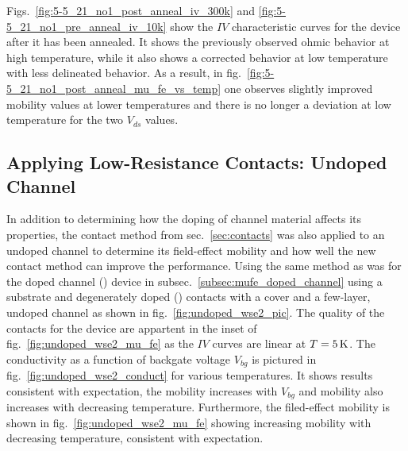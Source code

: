 Figs.~\ref{fig:5-5_21_no1_post_anneal_iv_300k} and \ref{fig:5-5_21_no1_pre_anneal_iv_10k} show the $IV$ characteristic curves for the device after it has been annealed. It shows the previously observed ohmic behavior at high temperature, while it also shows a corrected behavior at low temperature with less delineated behavior. As a result, in fig.~\ref{fig:5-5_21_no1_post_anneal_mu_fe_vs_temp} one observes slightly improved mobility values at lower temperatures and there is no longer a deviation at low temperature for the two $V_{ds}$ values. 

\subsection{Applying Low-Resistance Contacts: Undoped Channel}\label{subsec:mufe_undoped_channel}
In addition to determining how the doping of channel material affects its properties, the contact method from sec.~\ref{sec:contacts} was also applied to an undoped channel to determine its field-effect mobility and how well the new contact method can improve the performance. Using the same method as was for the doped channel (\lightlyone) device in subsec.~\ref{subsec:mufe_doped_channel} using a \hbn substrate and degenerately doped (\degenerate) contacts with a \hbn cover and a few-layer, undoped  channel as shown in fig.~\ref{fig:undoped_wse2_pic}. The quality of the contacts for the device are appartent in the inset of fig.~\ref{fig:undoped_wse2_mu_fe} as the $IV$ curves are linear at $T=5\,\mathrm{K}$. The conductivity as a function of backgate voltage $V_{bg}$ is pictured in fig.~\ref{fig:undoped_wse2_conduct} for various temperatures. It shows results consistent with expectation, the mobility increases with $V_{bg}$ and mobility also increases with decreasing temperature. Furthermore, the filed-effect mobility is shown in fig.~\ref{fig:undoped_wse2_mu_fe} showing increasing mobility with decreasing temperature, consistent with expectation. 
